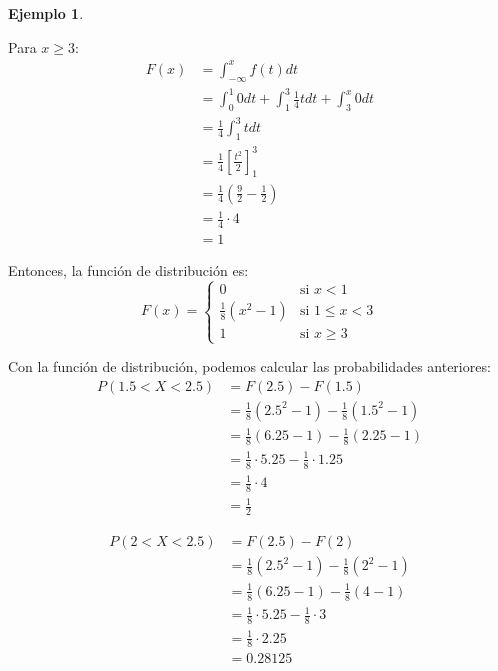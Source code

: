 \documentclass{article}
\theoremstyle{definition}
\newtheorem{example}[definition]{Ejemplo}
\theoremstyle{plain}
\theoremstyle{remark}
\begin{document}
\begin{example}
\begin{itemize}
Para $x \geq 3$:
\begin{align*}
F(x) &= \int_{-\infty}^{x} f(t) dt \\
&= \int_{0}^{1} 0 dt + \int_{1}^{3} \frac{1}{4} t dt + \int_{3}^{x} 0 dt \\
&= \frac{1}{4} \int_{1}^{3} t dt \\
&= \frac{1}{4} \left[ \frac{t^2}{2} \right]_{1}^{3} \\
&= \frac{1}{4} \left( \frac{9}{2} - \frac{1}{2} \right) \\
&= \frac{1}{4} \cdot 4 \\
&= 1
\end{align*}

Entonces, la función de distribución es:
\[
F(x) = \begin{cases}
0 & \text{si } x < 1 \\
\frac{1}{8} (x^2 - 1) & \text{si } 1 \leq x < 3 \\
1 & \text{si }x \geq 3
\end{cases}
\]

Con la función de distribución, podemos calcular las probabilidades anteriores:
\begin{align*}
P(1.5 < X < 2.5) &= F(2.5) - F(1.5) \\
&= \frac{1}{8} (2.5^2 - 1) - \frac{1}{8} (1.5^2 - 1) \\
&= \frac{1}{8} (6.25 - 1) - \frac{1}{8} (2.25 - 1) \\
&= \frac{1}{8} \cdot 5.25 - \frac{1}{8} \cdot 1.25 \\
&= \frac{1}{8} \cdot 4 \\
&= \frac{1}{2}
\end{align*}

\begin{align*}
P(2 < X < 2.5) &= F(2.5) - F(2) \\
&= \frac{1}{8} (2.5^2 - 1) - \frac{1}{8} (2^2 - 1) \\
&= \frac{1}{8} (6.25 - 1) - \frac{1}{8} (4 - 1) \\
&= \frac{1}{8} \cdot 5.25 - \frac{1}{8} \cdot 3 \\
&= \frac{1}{8} \cdot 2.25 \\
&= 0.28125
\end{align*}


\end{itemize}
\end{example}
\end{document}
